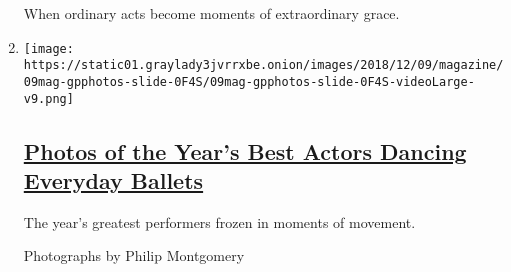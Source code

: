 \begin{enumerate}
  When ordinary acts become moments of extraordinary grace.
\item
  \texttt{[image: https://static01.graylady3jvrrxbe.onion/images/2018/12/09/magazine/09mag-gpphotos-slide-0F4S/09mag-gpphotos-slide-0F4S-videoLarge-v9.png]}

  \hypertarget{photos-of-the-years-best-actors-dancing-everyday-ballets}{%
  \subsection{\texorpdfstring{\href{/interactive/2018/12/05/magazine/great-performers-dance-photos.html}{Photos
  of the Year's Best Actors Dancing Everyday
  Ballets}}{Photos of the Year's Best Actors Dancing Everyday Ballets}}\label{photos-of-the-years-best-actors-dancing-everyday-ballets}}

  The year's greatest performers frozen in moments of movement.

  Photographs by Philip Montgomery
\end{enumerate}

